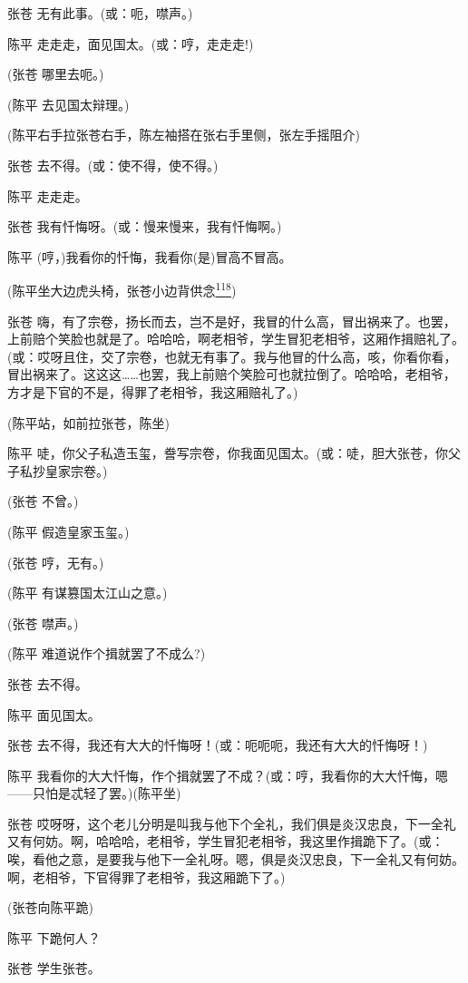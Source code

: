 张苍 无有此事。(或：呃，噤声。)

陈平 走走走，面见国太。(或：哼，走走走!)

(张苍 哪里去呃。)

(陈平 去见国太辩理。)

(陈平右手拉张苍右手，陈左袖搭在张右手里侧，张左手摇阻介)

张苍 去不得。(或：使不得，使不得。)

陈平 走走走。

张苍 我有忏悔呀。(或：慢来慢来，我有忏悔啊。)

陈平 (哼，)我看你的忏悔，我看你(是)冒高不冒高。

(陈平坐大边虎头椅，张苍小边背供念\protect\hyperlink{fn118}{\textsuperscript{118}})

张苍
嗨，有了宗卷，扬长而去，岂不是好，我冒的什么高，冒出祸来了。也罢，上前赔个笑脸也就是了。哈哈哈，啊老相爷，学生冒犯老相爷，这厢作揖赔礼了。(或：哎呀且住，交了宗卷，也就无有事了。我与他冒的什么高，咳，你看你看，冒出祸来了。这这这\ldots{}\ldots{}也罢，我上前赔个笑脸可也就拉倒了。哈哈哈，老相爷，方才是下官的不是，得罪了老相爷，我这厢赔礼了。)

(陈平站，如前拉张苍，陈坐)

陈平
唗，你父子私造玉玺，誊写宗卷，你我面见国太。(或：唗，胆大张苍，你父子私抄皇家宗卷。)

(张苍 不曾。)

(陈平 假造皇家玉玺。)

(张苍 哼，无有。)

(陈平 有谋篡国太江山之意。)

(张苍 噤声。)

(陈平 难道说作个揖就罢了不成么?)

张苍 去不得。

陈平 面见国太。

张苍 去不得，我还有大大的忏悔呀！(或：呃呃呃，我还有大大的忏悔呀！)

陈平
我看你的大大忏悔，作个揖就罢了不成？(或：哼，我看你的大大忏悔，嗯------只怕是忒轻了罢。)(陈平坐)

张苍
哎呀呀，这个老儿分明是叫我与他下个全礼，我们俱是炎汉忠良，下一全礼又有何妨。啊，哈哈哈，老相爷，学生冒犯老相爷，我这里作揖跪下了。(或：唉，看他之意，是要我与他下一全礼呀。嗯，俱是炎汉忠良，下一全礼又有何妨。啊，老相爷，下官得罪了老相爷，我这厢跪下了。)

(张苍向陈平跪)

陈平 下跪何人？

张苍 学生张苍。

